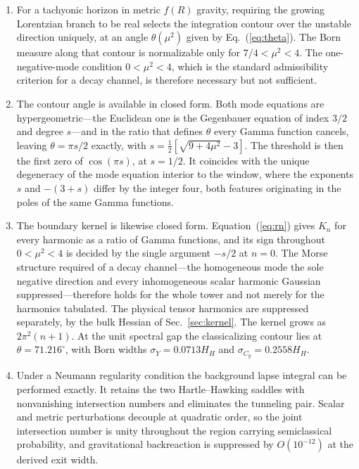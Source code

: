\documentclass[aps,prd,twocolumn,superscriptaddress,nofootinbib,longbibliography]{revtex4-2}
\begin{document}
\begin{enumerate}
\item For a tachyonic horizon in metric $f(R)$ gravity, requiring the growing
Lorentzian branch to be real selects the integration contour over the
unstable direction uniquely, at an angle $\theta(\mu^2)$ given by
Eq.~(\ref{eq:theta}). The Born measure along that contour is normalizable
only for $7/4<\mu^2<4$. The one-negative-mode condition $0<\mu^2<4$, which is
the standard admissibility criterion for a decay channel, is therefore
necessary but not sufficient.

\item The contour angle is available in closed form. Both mode equations are
hypergeometric---the Euclidean one is the Gegenbauer equation of index $3/2$
and degree $s$---and in the ratio that defines $\theta$ every Gamma function
cancels, leaving $\theta=\pi s/2$ exactly, with
$s=\tfrac12[\sqrt{9+4\mu^2}-3]$. The threshold is then the first zero of
$\cos(\pi s)$, at $s=1/2$. It coincides with the unique degeneracy of the
mode equation interior to the window, where the exponents $s$ and $-(3+s)$
differ by the integer four, both features originating in the poles of the
same Gamma functions.

\item The boundary kernel is likewise closed form. Equation~(\ref{eq:rn})
gives $K_n$ for every harmonic as a ratio of Gamma functions, and its sign
throughout $0<\mu^2<4$ is decided by the single argument $-s/2$ at $n=0$.
The Morse structure required of a decay channel---the homogeneous mode the
sole negative direction and every inhomogeneous scalar harmonic Gaussian
suppressed---therefore holds for the whole tower and not merely for the
harmonics tabulated. The physical tensor harmonics are suppressed
separately, by the bulk Hessian of Sec.~\ref{sec:kernel}. The kernel grows as
$2\pi^2(n+1)$. At the unit spectral gap the classicalizing contour lies at
$\theta=71.216^\circ$, with Born widths $\sigma_Y=0.0713H_H$ and
$\sigma_{C_g}=0.2558H_H$.

\item Under a Neumann regularity condition the background lapse integral can
be performed exactly. It retains the two Hartle--Hawking saddles with
nonvanishing intersection numbers and eliminates the tunneling pair. Scalar
and metric perturbations decouple at quadratic order, so the joint
intersection number is unity throughout the region carrying semiclassical
probability, and gravitational backreaction is suppressed by
$O(10^{-12})$ at the derived exit width.


\end{enumerate}
\end{document}
